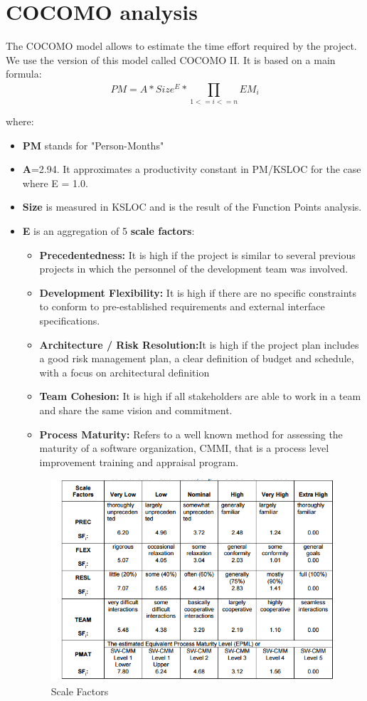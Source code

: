 \section{COCOMO analysis}
The COCOMO model allows to estimate the time effort required by the project. We use the version of this model called COCOMO II. It is based on a main formula:
\begin{equation}
PM = A * Size^{E} * \prod_{1<=i<=n}^{} EM_{i} 
\end{equation}

where:
\begin{itemize}
\item \textbf{PM} stands for "Person-Months"
\item \textbf{A}=2.94. It approximates a productivity constant in PM/KSLOC for the case where E = 1.0.
\item \textbf{Size} is measured in KSLOC and is the result of the Function Points analysis.
\item \textbf{E} is an aggregation of 5 \textbf{scale factors}:
	\begin{itemize}[label = {-}]
	\item \textbf{Precedentedness:} It is high if the project is similar to several previous projects in which the personnel of the development team was involved.
	\item \textbf{Development Flexibility:} It is high if there are no specific constraints to conform to pre-established 		requirements and external interface specifications.
	\item \textbf{Architecture / Risk Resolution:}It is high if the project plan includes a good risk management plan, a clear definition of budget and schedule, with a focus on architectural definition
\item \textbf{Team Cohesion:} It is high if all stakeholders are able to work in a team and share the same vision and commitment.
\item \textbf{Process Maturity:} Refers to a well known method for assessing the maturity of a software organization, CMMI, that is a process level improvement training and appraisal program.
	\end{itemize}
\begin{figure}[H]	
	\centering
	\includegraphics[scale = 0.7]{img/scaleFactors.png}
	\caption{Scale Factors}
\end{figure}


\end{itemize}
